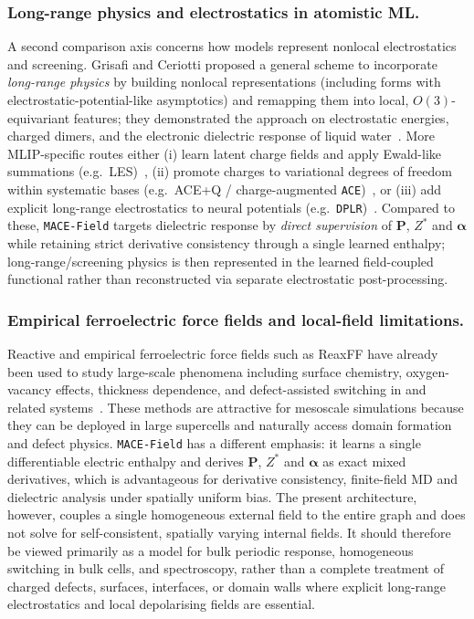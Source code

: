 \documentclass[aps,physrev,graphicx,amsmath,amssymb,
               reprint,superscriptaddress]{revtex4-2}
\begin{document}
\subsubsection*{Long-range physics and electrostatics in atomistic ML.}
A second comparison axis concerns how models represent nonlocal electrostatics and screening. Grisafi and Ceriotti proposed a general scheme to incorporate \emph{long-range physics} by building nonlocal representations (including forms with electrostatic-potential-like asymptotics) and remapping them into local, $O(3)$-equivariant features; they demonstrated the approach on electrostatic energies, charged dimers, and the electronic dielectric response of liquid water~\cite{Grisafi2019}. More MLIP-specific routes either (i) learn latent charge fields and apply Ewald-like summations (e.g.\ LES)~\cite{les-2025}, (ii) promote charges to variational degrees of freedom within systematic bases (e.g.\ ACE+Q / charge-augmented \texttt{ACE})~\cite{cace-2024}, or (iii) add explicit long-range electrostatics to neural potentials (e.g.\ \texttt{DPLR})~\cite{Zhang2022DPLR}. Compared to these, \texttt{MACE-Field} targets dielectric response by \emph{direct supervision} of $\mathbf P$, $Z^*$ and $\boldsymbol\alpha$ while retaining strict derivative consistency through a single learned enthalpy; long-range/screening physics is then represented in the learned field-coupled functional rather than reconstructed via separate electrostatic post-processing.

\subsubsection*{Empirical ferroelectric force fields and local-field limitations.}
Reactive and empirical ferroelectric force fields such as ReaxFF have already been used to study large-scale phenomena including surface chemistry, oxygen-vacancy effects, thickness dependence, and defect-assisted switching in  and related systems~\cite{Akbarian2019ReaxFFBaTiO3,Kelley2022VacancyFerroelectrics}. These methods are attractive for mesoscale simulations because they can be deployed in large supercells and naturally access domain formation and defect physics. \texttt{MACE-Field} has a different emphasis: it learns a single differentiable electric enthalpy and derives $\mathbf P$, $Z^*$ and $\boldsymbol\alpha$ as exact mixed derivatives, which is advantageous for derivative consistency, finite-field MD and dielectric analysis under spatially uniform bias. The present architecture, however, couples a single homogeneous external field to the entire graph and does not solve for self-consistent, spatially varying internal fields. It should therefore be viewed primarily as a model for bulk periodic response, homogeneous switching in bulk cells, and spectroscopy, rather than a complete treatment of charged defects, surfaces, interfaces, or domain walls where explicit long-range electrostatics and local depolarising fields are essential.
\end{document}
